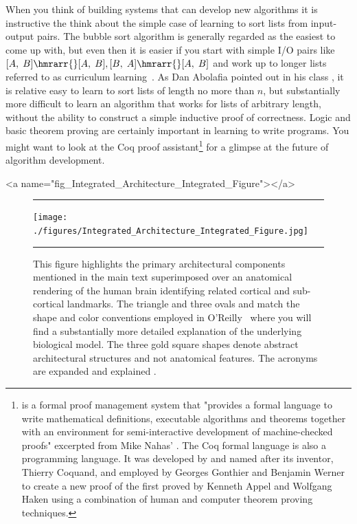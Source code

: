 When you think of building systems that can develop new algorithms it is instructive the think about the simple case of learning to sort lists from input-output pairs. The bubble sort algorithm is generally regarded as the easiest to come up with, but even then it is easier if you start with simple I/O pairs like $[A,\;B] \hmrarr{} [A,\;B], [B,\;A] \hmrarr{} [A,\;B]$ and work up to longer lists \emdash{} referred to as curriculum learning~\cite{BengioetalICML-09}. As Dan Abolafia pointed out in his class {}, it is relative easy to learn to sort lists of length no more than $n$, but substantially more difficult to learn an algorithm that works for lists of arbitrary length, without the ability to construct a simple inductive proof of correctness. Logic and basic theorem proving are certainly important in learning to write programs. You might want to look at the Coq proof assistant\footnote{%
%
  {} is a formal proof management system that "provides a formal language to write mathematical definitions, executable algorithms and theorems together with an environment for semi-interactive development of machine-checked proofs" \emdash{} excerpted from Mike Nahas' {}. The Coq formal language is also a programming language. It was developed by and named after its inventor, Thierry Coquand, and employed by Georges Gonthier and Benjamin Werner to create a new proof of the {} first proved by Kenneth Appel and Wolfgang Haken using a combination of human and computer theorem proving techniques.} for a glimpse at the future of algorithm development.


\setcounter{figure}{0}


\rawhtml
<a name="fig_Integrated_Architecture_Integrated_Figure"></a>
\endrawhtml
\begin{figure}
%
  \hrule{}
%
  \begin{center}
    \texttt{[image: ./figures/Integrated\_Architecture\_Integrated\_Figure.jpg]}
  \end{center}
%
  \caption{This figure highlights the primary architectural components mentioned in the main text superimposed over an anatomical rendering of the human brain identifying related cortical and sub-cortical landmarks. The triangle and three ovals and match the shape and color conventions employed in O'Reilly~\cite{OReillySCIENCE-06} where you will find a substantially more detailed explanation of the underlying biological model. The three gold square shapes denote abstract architectural structures and not anatomical features. The acronyms are expanded and explained {}.}
%
  \hrule{}
%
\end{figure}

